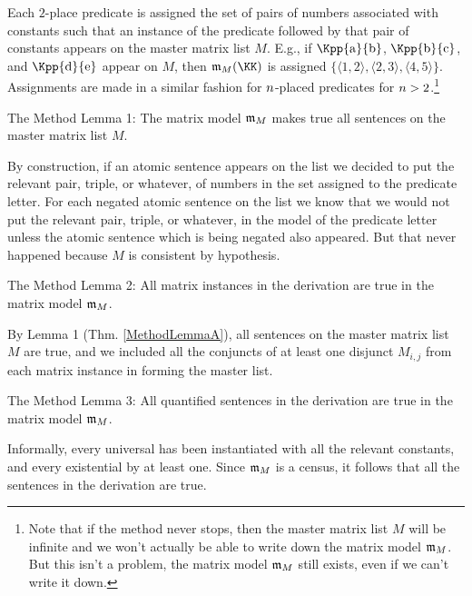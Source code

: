 Each $2$-place predicate is assigned the set of pairs of numbers associated with constants such that an instance of the predicate followed by that pair of constants appears on the master matrix list $M$. 
E.g., if $\Kpp{\constant{a}}{\constant{b}}$, $\Kpp{\constant{b}}{\constant{c}}$, and $\Kpp{\constant{d}}{\constant{e}}$ appear on $M$, then $\IntA_M(\KK)$ is assigned $\{\langle1,2\rangle,\langle2,3\rangle,\langle4,5\rangle\}$.
Assignments are made in a similar fashion for $n$-placed predicates for $n>2$.\footnote{Note 
that if the method never stops, then the master matrix list $M$ will be infinite and we won't actually be able to write down the matrix model $\mathfrak{m}_M$. 
But this isn't a problem, the matrix model $\mathfrak{m}_M$ still exists, even if we can't write it down.} 
\begin{THEOREM}{ The Method Lemma 1:}
The matrix model $\mathfrak{m}_M$ makes true all sentences on the master matrix list $M$.
\end{THEOREM}
\begin{PROOF}
By construction, if an atomic sentence appears on the list we decided to put the relevant pair, triple, or whatever, of numbers in the set assigned to the predicate letter. 
For each negated atomic sentence on the list we know that we would not put the relevant pair, triple, or whatever, in the model of the predicate letter unless the atomic sentence which is being negated also appeared. 
But that never happened because $M$ is consistent by hypothesis.
\end{PROOF}
\begin{THEOREM}{ The Method Lemma 2:}
All matrix instances in the derivation are true in the matrix model $\mathfrak{m}_M$.
\end{THEOREM}
\begin{PROOF}
By Lemma 1 (Thm. \ref{MethodLemmaA}), all sentences on the master matrix list $M$ are true, and we included all the conjuncts of at least one disjunct $M_{i,j}$ from each matrix instance in forming the master list.
\end{PROOF}
\begin{THEOREM}{ The Method Lemma 3:}
All quantified sentences in the derivation are true in the matrix model $\mathfrak{m}_M$.
\end{THEOREM}

Informally, every universal has been instantiated with all the relevant constants, and every existential by at least one. 
Since $\mathfrak{m}_M$ is a census, it follows that all the sentences in the derivation are true.

